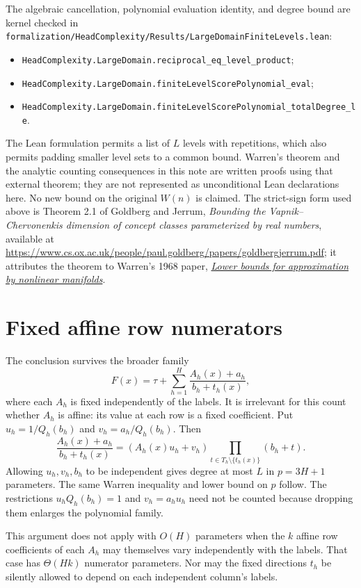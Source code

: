 \documentclass[11pt]{article}
\begin{document}
The algebraic cancellation, polynomial evaluation identity, and degree
bound are kernel checked in
\texttt{formalization/HeadComplexity/Results/LargeDomainFiniteLevels.lean}:
\begin{itemize}
\item \texttt{HeadComplexity.LargeDomain.reciprocal\_eq\_level\_product};
\item \texttt{HeadComplexity.LargeDomain.finiteLevelScorePolynomial\_eval};
\item \texttt{HeadComplexity.LargeDomain.finiteLevelScorePolynomial\_totalDegree\_le}.
\end{itemize}
The Lean formulation permits a list of $L$ levels with repetitions,
which also permits padding smaller level sets to a common bound.
Warren's theorem and the analytic counting consequences in this note
are written proofs using that external theorem; they are not represented
as unconditional Lean declarations here. No new bound on the original
$W(n)$ is claimed. The strict-sign form used above is Theorem 2.1 of
Goldberg and Jerrum, \emph{Bounding the Vapnik--Chervonenkis dimension
of concept classes parameterized by real numbers}, available at
\url{https://www.cs.ox.ac.uk/people/paul.goldberg/papers/goldbergjerrum.pdf};
it attributes the theorem to Warren's 1968 paper,
\href{https://doi.org/10.1090/S0002-9947-1968-0226281-1}{\emph{Lower bounds
for approximation by nonlinear manifolds}}.

\section{Fixed affine row numerators}

The conclusion survives the broader family
\[
 F(x)=\tau+\sum_{h=1}^H\frac{A_h(x)+a_h}{b_h+t_h(x)},
\]
where each $A_h$ is fixed independently of the labels. It is irrelevant
for this count whether $A_h$ is affine: its value at each row is a fixed
coefficient. Put $u_h=1/Q_h(b_h)$ and $v_h=a_h/Q_h(b_h)$. Then
\[
 \frac{A_h(x)+a_h}{b_h+t_h(x)}
  =(A_h(x)u_h+v_h)
       \prod_{t\in T_h\setminus\{t_h(x)\}}(b_h+t).
\]
Allowing $u_h,v_h,b_h$ to be independent gives degree at most $L$ in
$p=3H+1$ parameters. The same Warren inequality and lower bound on $p$
follow. The restrictions $u_hQ_h(b_h)=1$ and
$v_h=a_hu_h$ need not be counted because dropping them enlarges the
polynomial family.

This argument does not apply with $O(H)$ parameters when the $k$
affine row coefficients of each $A_h$ may themselves vary independently
with the labels. That case has $\Theta(Hk)$ numerator parameters. Nor
may the fixed directions $t_h$ be silently allowed to depend on each
independent column's labels.
\end{document}
